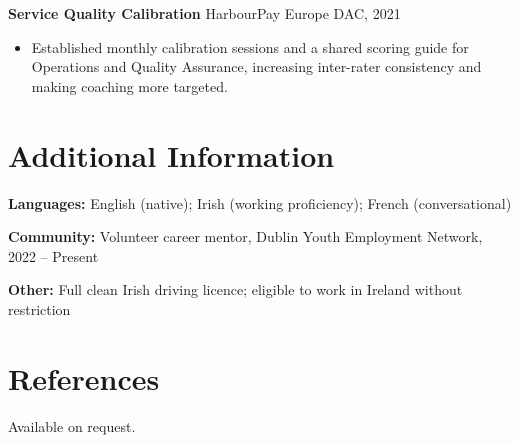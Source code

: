 \documentclass[10pt,a4paper]{article}
\begin{document}
\textbf{Service Quality Calibration} \hfill HarbourPay Europe DAC, 2021
\begin{itemize}
  \item Established monthly calibration sessions and a shared scoring guide for Operations and Quality Assurance, increasing inter-rater consistency and making coaching more targeted.
\end{itemize}

\section{Additional Information}

\textbf{Languages:} English (native); Irish (working proficiency); French (conversational)\par
\vspace{3pt}
\textbf{Community:} Volunteer career mentor, Dublin Youth Employment Network, 2022 -- Present\par
\vspace{3pt}
\textbf{Other:} Full clean Irish driving licence; eligible to work in Ireland without restriction

\section{References}

Available on request.
\end{document}
